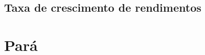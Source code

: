 \documentclass[8pt]{beamer}
\begin{document}
\subsection{Taxa de crescimento de rendimentos}

\begin{frame}
\textit{\hyperlink{indice_principal_amz_mt}{}}

\end{frame}


\begin{frame}
\textit{\hyperlink{indice_principal_amz_mt}{}}

\end{frame}


\begin{frame}
\textit{\hyperlink{indice_principal_amz_mt}{}}

\end{frame}


\section{Pará}
\end{document}
